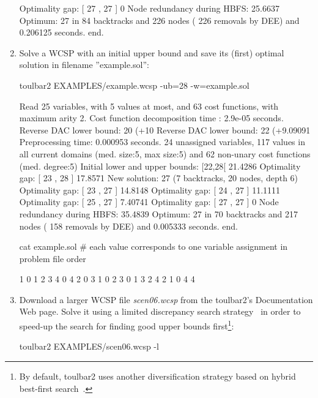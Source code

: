 \begin{enumerate}
{\begin{DoxyCode}
Optimality gap: [ 27 , 27 ] 0 %
Node redundancy during HBFS: 25.6637 %
Optimum: 27 in 84 backtracks and 226 nodes ( 226 removals by DEE) and 0.206125 seconds.
end.
\end{DoxyCode}}
\item Solve a WCSP with an initial upper bound and save its (first) optimal solution
in filename ''example.sol'':
\begin{DoxyCode}
	toulbar2 EXAMPLES/example.wcsp -ub=28 -w=example.sol
\end{DoxyCode}
{\scriptsize
\begin{DoxyCode}
Read 25 variables, with 5 values at most, and 63 cost functions, with maximum arity 2.
Cost function decomposition time : 2.9e-05 seconds.
Reverse DAC lower bound: 20 (+10%
Reverse DAC lower bound: 22 (+9.09091%
Preprocessing time: 0.000953 seconds.
24 unassigned variables, 117 values in all current domains (med. size:5, max size:5) and 62 non-unary cost functions (med. degree:5)
Initial lower and upper bounds: [22,28[ 21.4286%
Optimality gap: [ 23 , 28 ] 17.8571 %
New solution: 27 (7 backtracks, 20 nodes, depth 6)
Optimality gap: [ 23 , 27 ] 14.8148 %
Optimality gap: [ 24 , 27 ] 11.1111 %
Optimality gap: [ 25 , 27 ] 7.40741 %
Optimality gap: [ 27 , 27 ] 0 %
Node redundancy during HBFS: 35.4839 %
Optimum: 27 in 70 backtracks and 217 nodes ( 158 removals by DEE) and 0.005333 seconds.
end.
\end{DoxyCode}}
\begin{DoxyCode}
cat example.sol
# each value corresponds to one variable assignment in problem file order
\end{DoxyCode}
{\scriptsize
\begin{DoxyCode}
1 0 1 2 3 4 0 4 2 0 3 1 0 2 3 0 1 3 2 4 2 1 0 4 4
\end{DoxyCode}}
\item Download a larger WCSP file {\em scen06.wcsp} from the toulbar2's Documentation Web page. Solve it using a limited discrepancy search strategy~\cite{Ginsberg95} in order to speed-up the search for finding good upper bounds first\footnote{By default, toulbar2 uses another diversification strategy based on hybrid best-first search~\cite{Katsirelos15a}.}:
\begin{DoxyCode}
	toulbar2 EXAMPLES/scen06.wcsp -l
\end{DoxyCode}
{\scriptsize
\begin{DoxyCode}

\end{DoxyCode}}
\end{enumerate}
